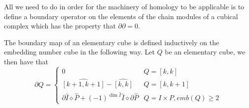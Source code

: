 \begin{example}
All we need to do in order for the machinery of homology to be applicable is to define a boundary operator on the elements of the chain modules of a cubical complex which has the property that $\partial \partial = 0$.
\begin{definition}
  The boundary map of an elementary cube is defined inductively on the embedding number cube in the following way. Let $Q$ be an elementary cube, we then have that
  \[ \partial \hat Q =
    \begin{cases}
      0 & Q = [k,k] \\
      \widehat{[k+1,k+1]} - \widehat{[k,k]} & Q = [k,k+1] \\
      \partial \hat I \diamond \hat P +(-1)^{\dim \hat I} \hat I \diamond \partial \hat P & Q=I \times P, emb(Q) \geq 2


\end{cases}\]
\end{definition}
\end{example}

